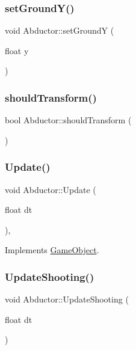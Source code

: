 \subsubsection{\texorpdfstring{set\+Ground\+Y()}{setGroundY()}}
{\footnotesize\ttfamily void Abductor\+::set\+GroundY (\begin{DoxyParamCaption}\item[{float}]{y }\end{DoxyParamCaption})}

\hypertarget{class_abductor_af50d368af0d068122b2755a238bebfb7}{}\label{class_abductor_af50d368af0d068122b2755a238bebfb7} 
\subsubsection{\texorpdfstring{should\+Transform()}{shouldTransform()}}
{\footnotesize\ttfamily bool Abductor\+::should\+Transform (\begin{DoxyParamCaption}{ }\end{DoxyParamCaption})}

\hypertarget{class_abductor_a16c030380d94caf386171cda40ed1eb8}{}\label{class_abductor_a16c030380d94caf386171cda40ed1eb8} 
\subsubsection{\texorpdfstring{Update()}{Update()}}
{\footnotesize\ttfamily void Abductor\+::\+Update (\begin{DoxyParamCaption}\item[{float}]{dt }\end{DoxyParamCaption})\hspace{0.3cm}{\ttfamily [override]}, {\ttfamily [virtual]}}



Implements \hyperlink{class_game_object_a93ed63df640deb516a020530e7f8e045}{Game\+Object}.

\hypertarget{class_abductor_a81e65919dcbdf472395f946d110825b2}{}\label{class_abductor_a81e65919dcbdf472395f946d110825b2} 
\subsubsection{\texorpdfstring{Update\+Shooting()}{UpdateShooting()}}
{\footnotesize\ttfamily void Abductor\+::\+Update\+Shooting (\begin{DoxyParamCaption}\item[{float}]{dt }\end{DoxyParamCaption})}

